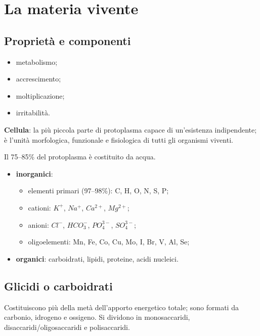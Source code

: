 \section{La materia vivente}

\subsection{Proprietà e componenti}

\begin{itemize}
  \item metabolismo;
  \item accrescimento;
  \item moltiplicazione;
  \item irritabilità.
\end{itemize}

\textbf{Cellula}: la più piccola parte di protoplasma capace di un'esistenza indipendente; è l'unità morfologica, funzionale e fisiologica di tutti gli organismi viventi.

Il 75--85\% del protoplasma è costituito da acqua.
\begin{itemize}
  \item \textbf{inorganici}:
    \begin{itemize}
      \item elementi primari (97--98\%): C, H, O, N, S, P;
      \item cationi: $K^+$, $Na^+$, $Ca^{2+}$, $Mg^{2+}$;
      \item anioni: $Cl^-$, $HCO_3^-$, $PO_4^{3-}$, $SO_4^{3-}$;
      \item oligoelementi: Mn, Fe, Co, Cu, Mo, I, Br, V, Al, Se;
    \end{itemize}
  \item \textbf{organici}: carboidrati, lipidi, proteine, acidi nucleici.
\end{itemize}

\subsection{Glicidi o carboidrati}

Costituiscono più della metà dell'apporto energetico totale; sono formati da carbonio, idrogeno e ossigeno. Si dividono in monosaccaridi, disaccaridi/oligosaccaridi e polisaccaridi.

